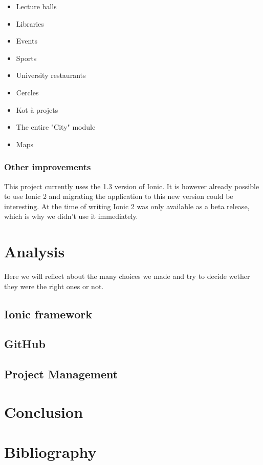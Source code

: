 \documentclass[11pt, a4paper]{report}
\begin{document}
\begin{itemize}
\item Lecture halls
\item Libraries
\item Events
\item Sports
\item University restaurants
\item Cercles
\item Kot à projets
\item The entire "City" module
\item Maps
\end{itemize}

\subsection{Other improvements}

This project currently uses the 1.3 version of Ionic. It is however already possible to use Ionic 2 and migrating the application to this new version could be interesting. At the time of writing Ionic 2 was only available as a beta release, which is why we didn't use it immediately. 



\chapter{Analysis}

Here we will reflect about the many choices we made and try to decide wether they were the right ones or not.

\section{Ionic framework}

\section{GitHub}

\section{Project Management}


\chapter{Conclusion} 

\chapter{Bibliography}
\end{document}

